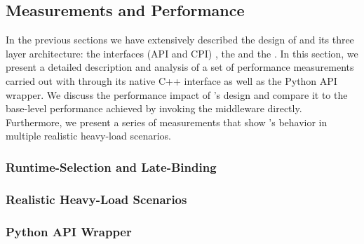   \subsection{Measurements and Performance}
  
  In the previous sections we have extensively described the design of
  \thesagaimpl and its three layer architecture: the interfaces (API and CPI) ,
  the \thesagaimplrt and the \thesagaimpladap. In this section, we present a
  detailed description and analysis of a set of performance measurements
  carried out with \thesagaimpl through its native C++ interface as well as the
  Python API wrapper. We discuss the performance impact of \thesagaimpl's
  design and compare it to the base-level performance achieved by invoking the
  middleware directly. Furthermore, we present a series of measurements that
  show \thesagaimpl's behavior in multiple realistic heavy-load scenarios.
  

  \subsubsection{Runtime-Selection and Late-Binding}

  \subsubsection{Realistic Heavy-Load Scenarios}

  \subsubsection{Python API Wrapper}
